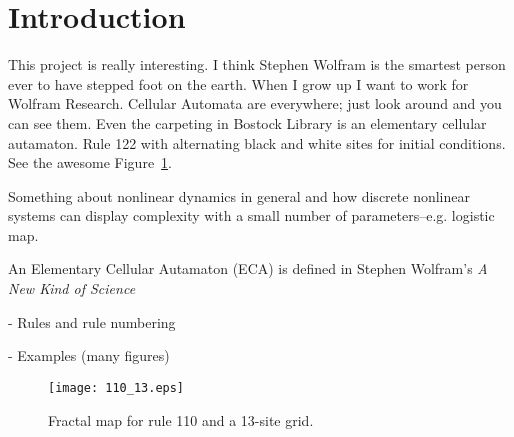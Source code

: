 \section{Introduction}

This project is really interesting.
I think Stephen Wolfram is the smartest person ever to have stepped
foot on the earth.
When I grow up I want to work for Wolfram Research.
Cellular Automata are everywhere; just look around and you can see
them.
Even the carpeting in Bostock Library is an elementary cellular
autamaton.
Rule 122 with alternating black and white sites for initial
conditions.
See the awesome Figure~\ref{110_map}.

Something about nonlinear dynamics in general and how discrete
nonlinear systems can display complexity with a small number of
parameters--e.g. logistic map.

An Elementary Cellular Autamaton (ECA) is defined in Stephen Wolfram's
\emph{A New Kind of Science}~\cite{anks}

- Rules and rule numbering

- Examples (many figures)

\begin{figure}
\centering
\texttt{[image: 110\_13.eps]}
\caption{\label{110_map} Fractal map for rule 110 and a 13-site grid.}
\end{figure}
